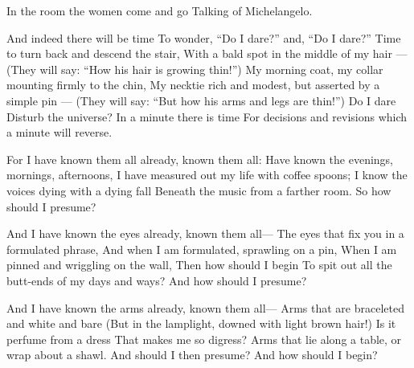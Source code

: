 \documentclass[fontsize=9, a5paper]{scrbook}
\begin{document}
\begin{poem}
	\begin{stanza}
		In the room the women come and go\verseline
		Talking of Michelangelo.
	\end{stanza}
	
	\begin{stanza}
		And indeed there will be time\verseline
		To wonder, “Do I dare?” and, “Do I dare?”\verseline
		Time to turn back and descend the stair,\verseline
		With a bald spot in the middle of my hair —\verseline
		(They will say: “How his hair is growing thin!”)\verseline
		My morning coat, my collar mounting firmly to the chin,\verseline
		My necktie rich and modest, but asserted by a simple pin —\verseline
		(They will say: “But how his arms and legs are thin!”)\verseline
		Do I dare\verseline
		Disturb the universe?\verseline
		In a minute there is time\verseline
		For decisions and revisions which a minute will reverse.
	\end{stanza}
	
	\begin{stanza}
		For I have known them all already, known them all:\verseline
		Have known the evenings, mornings, afternoons,\verseline
		I have measured out my life with coffee spoons;\verseline
		I know the voices dying with a dying fall\verseline
		Beneath the music from a farther room.\verseline
		               \verseindent So how should I presume?
	\end{stanza}

	\pagebreak

	\begin{stanza}
		And I have known the eyes already, known them all—\verseline
		The eyes that fix you in a formulated phrase,\verseline
		And when I am formulated, sprawling on a pin,\verseline
		When I am pinned and wriggling on the wall,\verseline
		Then how should I begin\verseline
		To spit out all the butt-ends of my days and ways?\verseline
		               \verseindent And how should I presume?
	\end{stanza}
	
	\begin{stanza}
		And I have known the arms already, known them all—\verseline
		Arms that are braceleted and white and bare\verseline
		(But in the lamplight, downed with light brown hair!)\verseline
		Is it perfume from a dress\verseline
		That makes me so digress?\verseline
		Arms that lie along a table, or wrap about a shawl.\verseline
		               \verseindent And should I then presume?\verseline
		               \verseindent And how should I begin?
	\end{stanza}


\end{poem}
\end{document}
